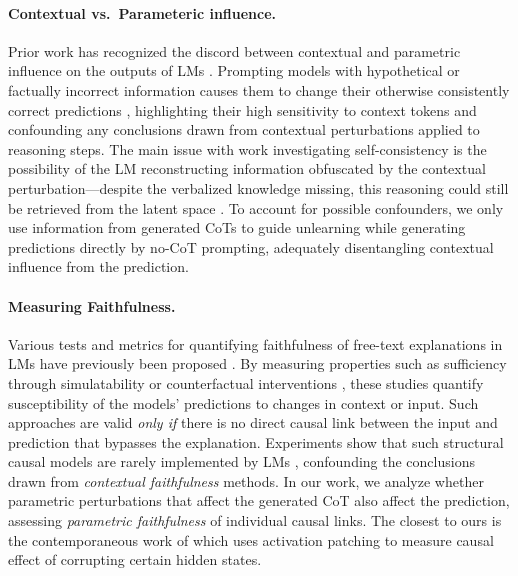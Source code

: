 \paragraph{Contextual vs.\ Parameteric influence.}  
Prior work has recognized the discord between contextual and parametric influence on the outputs of LMs \citep{neeman-etal-2023-disentqa,bao2024llms}.
Prompting models with hypothetical or factually incorrect information causes them to change their otherwise consistently correct predictions \citep{kim2021presupposition,kim2023questionable,simhi2024distinguishing,minder2024controllable}, highlighting their high sensitivity to context tokens and confounding any conclusions drawn from contextual perturbations applied to reasoning steps.
The main issue with work investigating self-consistency is the possibility of the LM reconstructing information obfuscated by the contextual perturbation---despite the verbalized knowledge missing, this reasoning could still be retrieved from the latent space \citep{yang2024latently, deng2024explicit}.
To account for possible confounders, we only use information from generated CoTs to guide unlearning while generating predictions directly by no-CoT prompting, adequately disentangling contextual influence from the prediction.
%



\paragraph{Measuring Faithfulness.}
Various tests and metrics for quantifying faithfulness of free-text explanations in LMs have previously been proposed \citep{lanham2023measuring,bentham2024chain,atanasova2023faithfulness,siegel2024probabilities}.
By measuring properties such as sufficiency through simulatability or counterfactual interventions \citep{atanasova2023faithfulness,lanham2023measuring}, these studies quantify susceptibility of the models' predictions to changes in context or input.
Such approaches are valid \textit{only if} there is no direct causal link between the input and prediction that bypasses the explanation.
%
Experiments show that such structural causal models are rarely implemented by LMs \citep{bao2024llms}, confounding the conclusions drawn from \textit{contextual faithfulness} methods.
%
%
In our work, we analyze whether parametric perturbations that affect the generated CoT also affect the prediction, assessing \textit{parametric faithfulness} of individual causal links.
The closest to ours is the contemporaneous work of \citet{yao2024patching} which uses activation patching to measure causal effect of corrupting certain hidden states.
%

%

%
%

%
%
%
%

%
%
%
%

%

%

%
%
%
%
%
